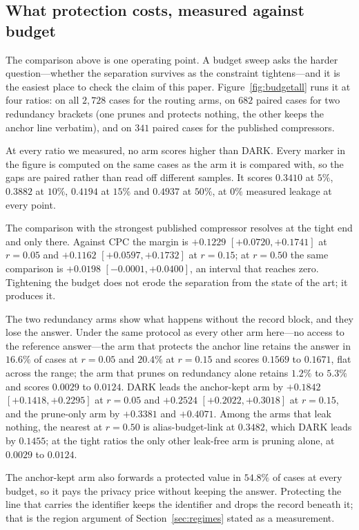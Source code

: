 \subsection{What protection costs, measured against budget}
\label{sec:budgetall}

The comparison above is one operating point. A budget sweep asks the harder question---whether the
separation survives as the constraint tightens---and it is the easiest place to check the claim of
this paper. Figure~\ref{fig:budgetall} runs it at four ratios: on all $2{,}728$ cases for the routing
arms, on $682$ paired cases for two redundancy brackets (one prunes and protects nothing, the other
keeps the anchor line verbatim), and on $341$ paired cases for the published compressors.

At every ratio we measured, no arm scores higher than \textsc{DARK}. Every marker in the figure is
computed on the same cases as the arm it is compared with, so the gaps are paired rather than read
off different samples. It scores $0.3410$ at $5\%$, $0.3882$ at $10\%$, $0.4194$ at $15\%$ and
$0.4937$ at $50\%$, at $0\%$ measured leakage at every point.

The comparison with the strongest published compressor resolves at the tight end and only there.
Against CPC the margin is $+0.1229$ $[+0.0720,+0.1741]$ at $r=0.05$ and $+0.1162$
$[+0.0597,+0.1732]$ at $r=0.15$; at $r=0.50$ the same comparison is $+0.0198$
$[-0.0001,+0.0400]$, an interval that reaches zero. Tightening the budget does not erode the
separation from the state of the art; it produces it.

The two redundancy arms show what happens without the record block, and they lose the answer. Under
the same protocol as every other arm here---no access to the reference answer---the arm that protects
the anchor line retains the answer in $16.6\%$ of cases at $r=0.05$ and $20.4\%$ at $r=0.15$ and
scores $0.1569$ to $0.1671$, flat across the range; the arm that prunes on redundancy alone retains
$1.2\%$ to $5.3\%$ and scores $0.0029$ to $0.0124$. \textsc{DARK} leads the anchor-kept arm by
$+0.1842$ $[+0.1418,+0.2295]$ at $r=0.05$ and $+0.2524$ $[+0.2022,+0.3018]$ at $r=0.15$, and the
prune-only arm by $+0.3381$ and $+0.4071$. Among the arms that leak nothing, the nearest at
$r=0.50$ is alias-budget-link at $0.3482$, which \textsc{DARK} leads by $0.1455$; at the tight
ratios the only other leak-free arm is pruning alone, at $0.0029$ to $0.0124$.

The anchor-kept arm also forwards a protected value in $54.8\%$ of cases at every budget, so it pays
the privacy price without keeping the answer. Protecting the line that carries the identifier keeps
the identifier and drops the record beneath it; that is the region argument of
Section~\ref{sec:regimes} stated as a measurement.

